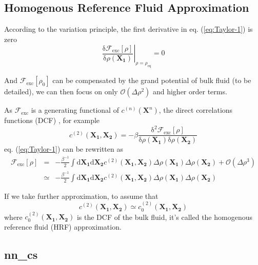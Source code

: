 \subsection{Homogenous Reference Fluid Approximation}

According to the variation principle, the first derivative in eq.
(\ref{eq:Taylor-1}) is zero
\begin{equation}
\left.\frac{\mathrm{\delta}\mathcal{F}_{\mathrm{exc}}\left[\rho\right]}{\mathrm{\delta}\rho(\mathbf{X_{1}})}\right|_{\rho=\rho_{\mathrm{eq}}}=0
\end{equation}


And $\mathcal{F}_{\mathrm{exc}}\left[\rho_{0}\right]$ can be compensated
by the grand potential of bulk fluid (to be detailed), we can then
focus on only $\mathcal{O}(\Delta\rho^{2})$ and higher order terms.

As $\mathcal{F}_{\mathrm{exc}}$ is a generating functional of $c^{(n)}(\mathbf{X}^{n})$,
the direct correlations functions (DCF) \citep{Hensen-McDonald},
for example
\begin{equation}
c^{(2)}(\mathbf{X_{1}},\mathbf{X_{2}})=-\beta\frac{\mathrm{\delta}^{2}\mathcal{F}_{\mathrm{exc}}\left[\rho\right]}{\mathrm{\delta}\rho(\mathbf{X_{1}})\mathrm{\delta}\rho(\mathbf{X_{2}})}
\end{equation}
eq. (\ref{eq:Taylor-1}) can be rewritten as
\begin{eqnarray}
\mathcal{F}_{\mathrm{exc}}\left[\rho\right] & = & -\frac{\beta^{-1}}{2}\int\mathrm{d}\mathbf{X_{1}}\mathrm{d}\mathbf{X_{2}}c^{(2)}(\mathbf{X_{1}},\mathbf{X_{2}})\Delta\rho(\mathbf{X_{1}})\Delta\rho(\mathbf{X_{2}})+\mathcal{O}(\Delta\rho^{3})\nonumber \\
 & \simeq & -\frac{\beta^{-1}}{2}\int\mathrm{d}\mathbf{X_{1}}\mathrm{d}\mathbf{X_{2}}c^{(2)}(\mathbf{X_{1}},\mathbf{X_{2}})\Delta\rho(\mathbf{X_{1}})\Delta\rho(\mathbf{X_{2}})\label{eq:fexc-2nd-term-1}
\end{eqnarray}


If we take further approximation, to assume that
\begin{equation}
c^{(2)}(\mathbf{X_{1}},\mathbf{X_{2}})\simeq c_{0}^{(2)}(\mathbf{X_{1}},\mathbf{X_{2}})
\end{equation}
where $c_{0}^{(2)}(\mathbf{X_{1}},\mathbf{X_{2}})$ is the DCF of
the bulk fluid, it's called the homogenous reference fluid (HRF) approximation.


\subsection{nn\_cs}

